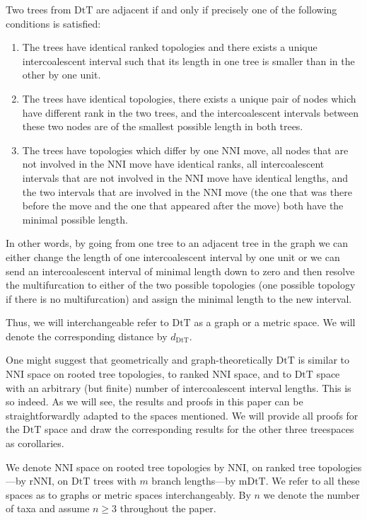 \documentclass{amsart}
\newcommand{\dts}{\mathrm{DtT}}
\newcommand{\nni}{\mathrm{NNI}}
\newcommand{\rnni}{\mathrm{rNNI}}
\newcommand{\mdts}{\mathrm{mDtT}}
\begin{document}
Two trees from $\dts$ are adjacent if and only if precisely one of the following
conditions is satisfied: 

\begin{enumerate}[(1)]
\item The trees have identical ranked topologies and there exists a unique
intercoalescent interval such that its length in one tree is smaller than in the
other by one unit. 
\item The trees have identical topologies, there exists a unique pair of nodes
which have different rank in the two trees, and the intercoalescent intervals 
between these two nodes are of the smallest possible length in both trees. 
\item The trees have topologies which differ by one NNI move, all nodes that
are not involved in the NNI move have identical ranks, all intercoalescent
intervals that are not involved in the NNI move have identical lengths, 
and the two intervals that are involved in the NNI move (the one that was there
before the move and the one that appeared after the move) both have the minimal
possible length.  
\end{enumerate}

In other words, by going from one tree to an adjacent tree in the graph we can
either change the length of one intercoalescent interval by one unit or we
can send an intercoalescent interval of minimal length down to zero and
then resolve the multifurcation to either of the two possible topologies
(one possible topology if there is no multifurcation) and
assign the minimal length to the new interval.

Thus, we will interchangeable refer to $\dts$ as a graph or a metric space. 
We will denote the corresponding distance by $d_\dts$. 

One might suggest that geometrically and graph-theoretically $\dts$ is similar to NNI space on rooted tree topologies, to ranked NNI space, and to $\dts$ space with an arbitrary (but finite) number of intercoalescent interval lengths. 
This is so indeed. 
As we will see, the results and proofs in this paper can be straightforwardly adapted to the spaces mentioned. 
We will provide all proofs for the $\dts$ space and draw the corresponding results for the other three treespaces as corollaries. 

We denote NNI space on rooted tree topologies by $\nni$, on ranked tree topologies---by $\rnni$, on $\dts$ trees with $m$ branch lengths---by $\mdts$.
We refer to all these spaces as to graphs or metric spaces interchangeably. 
By $n$ we denote the number of taxa and assume $n \geq 3$ throughout the paper.
\end{document}
